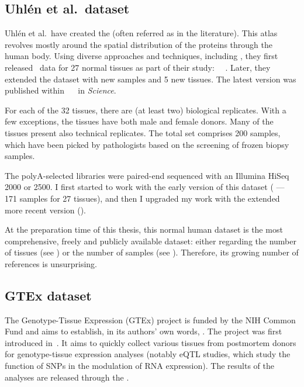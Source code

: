 \subsection{Uhlén et al.\ dataset}\label{subsec:uhlenPresentation}
\vspace*{-0.1in}
Uhlén et al.\ have created the
(often referred as  in the literature).
This atlas revolves mostly around the spatial
distribution of the proteins through the human body.
Using diverse approaches and techniques, including \Rnaseq,
they first released \Rnaseq\ data for 27 normal tissues
as part of their study:~%
~.
Later, they extended the dataset with new samples and 5 new
tissues. The latest version was published within~%
~ in \textit{Science}.

For each of the 32 tissues, there are (at least two) biological replicates.
With a few exceptions, the tissues have both male and female donors.
Many of the tissues present also technical replicates.
The total set comprises 200 samples,
which have been picked by pathologists
based on the screening of frozen biopsy samples.

The polyA-selected libraries were paired-end sequenced
with an Illumina HiSeq 2000 or 2500.
I first started to work with the early version of this dataset
( --- 171 samples for 27 tissues),
and then I upgraded my work with the extended more recent version
().

At the preparation time of this thesis, this normal human dataset is the
most comprehensive, freely and publicly available dataset:
either regarding the number of tissues (see )
or the number of samples (see ).
Therefore, its growing number of references is unsurprising.

\subsection{GTEx dataset}\label{subsec:gtexPresentation}
\vspace*{-0.1in}
The Genotype-Tissue Expression (\gls{GTEx}) project is funded by the \gls{NIH}
Common Fund and aims to establish, in its authors' own words,
.
The project was first introduced in~\citet{GTEx2013}. It aims to quickly collect
various tissues from postmortem donors for genotype-tissue expression analyses
(notably \gls{eQTL} studies, which study the function of \glspl{SNP}
in the modulation of \gls{RNA} expression).
The results of the
analyses are released through the .

